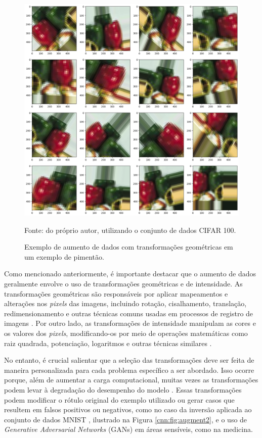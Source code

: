 \begin{figure}[H]
    \centering
    \caption{Exemplo de aumento de dados com transformações geométricas em um exemplo de pimentão.}
    \includegraphics[width=0.8\linewidth]{recursos/imagens/deep/dataaugmentation.png}
    \label{cnn:fig:augment}

     Fonte: do próprio autor, utilizando o conjunto de dados CIFAR 100\citep{Bossard2014Food-101Forests}.
\end{figure}

Como mencionado anteriormente, é importante destacar que o aumento de dados geralmente envolve o uso de transformações geométricas e de intensidade. As transformações geométricas são responsáveis por aplicar mapeamentos e alterações nos \textit{pixels} das imagens, incluindo rotação, cisalhamento, translação, redimensionamento e outras técnicas comuns usadas em processos de registro de imagens \citep{pedrini2008analise}. Por outro lado, as transformações de intensidade manipulam as cores e os valores dos \textit{pixels}, modificando-os por meio de operações matemáticas como raiz quadrada, potenciação, logaritmos e outras técnicas similares \citep{pedrini2008analise}.

No entanto, é crucial salientar que a seleção das transformações deve ser feita de maneira personalizada para cada problema específico a ser abordado. Isso ocorre porque, além de aumentar a carga computacional, muitas vezes as transformações podem levar à degradação do desempenho do modelo \citep{Carneiro2021EfficientProcessing, Hyttinen2020}. Essas transformações podem modificar o rótulo original do exemplo utilizado ou gerar casos que resultem em falsos positivos ou negativos, como no caso da inversão aplicada ao conjunto de dados MNIST \citep{LeCun2010MNISTDatabase}, ilustrado na Figura \ref{cnn:fig:augment2}, e o uso de \textit{Generative Adversarial Networks} (GANs) em áreas sensíveis, como na medicina.

